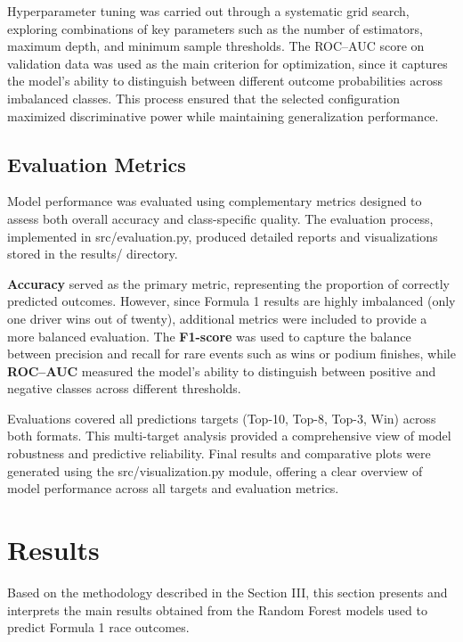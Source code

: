 \documentclass[11pt,a4paper]{article}
\begin{document}
Hyperparameter tuning was carried out through a systematic grid search, exploring combinations of key parameters such as the number of estimators, maximum depth, and minimum sample thresholds. The ROC–AUC score on validation data was used as the main criterion for optimization, since it captures the model’s ability to distinguish between different outcome probabilities across imbalanced classes. This process ensured that the selected configuration maximized discriminative power while maintaining generalization performance.

\subsection{Evaluation Metrics}
\label{subsec:metrics}

Model performance was evaluated using complementary metrics designed to assess both overall accuracy and class-specific quality. The evaluation process, implemented in src/evaluation.py, produced detailed reports and visualizations stored in the results/ directory.

\textbf{Accuracy} served as the primary metric, representing the proportion of correctly predicted outcomes. However, since Formula 1 results are highly imbalanced (only one driver wins out of twenty), additional metrics were included to provide a more balanced evaluation. The \textbf{F1-score} was used to capture the balance between precision and recall for rare events such as wins or podium finishes, while \textbf{ROC–AUC} measured the model’s ability to distinguish between positive and negative classes across different thresholds.

Evaluations covered all predictions targets (Top-10, Top-8, Top-3, Win) across both formats. This multi-target analysis provided a comprehensive view of model robustness and predictive reliability. Final results and comparative plots were generated using the src/visualization.py module, offering a clear overview of model performance across all targets and evaluation metrics.



\section{Results}
\label{sec:results}

Based on the methodology described in the Section III, this section presents and interprets the main results obtained from the Random Forest models used to predict Formula 1 race outcomes.
\end{document}
